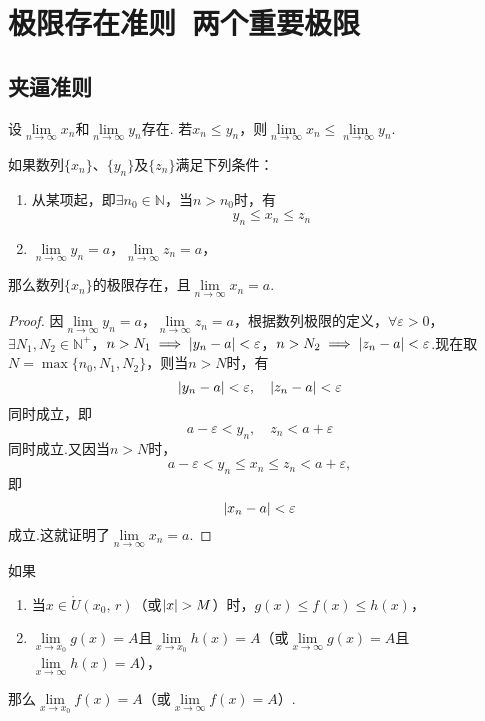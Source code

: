 \section{极限存在准则\ 两个重要极限}
\subsection{夹逼准则}
\begin{lemma}
设\(\lim\limits_{n\to\infty} x_n\)和\(\lim\limits_{n\to\infty} y_n\)存在.
若\(x_n \leqslant y_n\)，则\(\lim\limits_{n\to\infty} x_n \leqslant \lim\limits_{n\to\infty} y_n\).
\end{lemma}

\begin{theorem}\label{theorem:极限.夹逼准则}
如果数列\(\{x_n\}\)、\(\{y_n\}\)及\(\{z_n\}\)满足下列条件：
\begin{enumerate}
\item 从某项起，即\(\exists n_0 \in \mathbb{N}\)，当\(n > n_0\)时，有
\[y_n \leqslant x_n \leqslant z_n\]
\item \(\lim\limits_{n\to\infty}{y_n}=a\)，\(\lim\limits_{n\to\infty}{z_n}=a\)，%
\end{enumerate}
那么数列\(\{x_n\}\)的极限存在，且\(\lim\limits_{n\to\infty}{x_n}=a\).
\begin{proof}
因\(\lim\limits_{n\to\infty}{y_n}=a\)，\(\lim\limits_{n\to\infty}{z_n}=a\)，根据数列极限的定义，\(\forall \varepsilon > 0\)，\(\exists N_1,N_2 \in \mathbb{N}^+\)，\(n > N_1 \implies \abs{y_n - a} < \varepsilon\)，\(n > N_2 \implies \abs{z_n - a} < \varepsilon\).现在取\(N = \max\{n_0,N_1,N_2\}\)，则当\(n > N\)时，有\[
\abs{y_n - a} < \varepsilon,
\quad \abs{z_n - a} < \varepsilon
\]同时成立，即\[
a - \varepsilon < y_n,
\quad z_n < a + \varepsilon
\]同时成立.又因当\(n > N\)时，\[
a - \varepsilon < y_n \leqslant x_n \leqslant z_n < a + \varepsilon,
\]即\[
\abs{x_n - a} < \varepsilon
\]成立.这就证明了\(\lim\limits_{n\to\infty}{x_n}=a\).
\end{proof}
\end{theorem}

\begin{corollary}
如果
\begin{enumerate}
\item 当\(x \in \mathring{U}(x_0,\,r)\)（或\(\abs{x} > M\)）时，\(g(x) \leqslant f(x) \leqslant h(x)\)，%
\item \(\lim\limits_{x \to x_0} g(x) = A\)且\(\lim\limits_{x \to x_0} h(x) = A\)（或\(\lim\limits_{x \to \infty} g(x) = A\)且\(\lim\limits_{x \to \infty} h(x) = A\)），%
\end{enumerate}
那么\(\lim\limits_{x \to x_0} f(x) = A\)（或\(\lim\limits_{x \to \infty} f(x) = A\)）.
\end{corollary}

